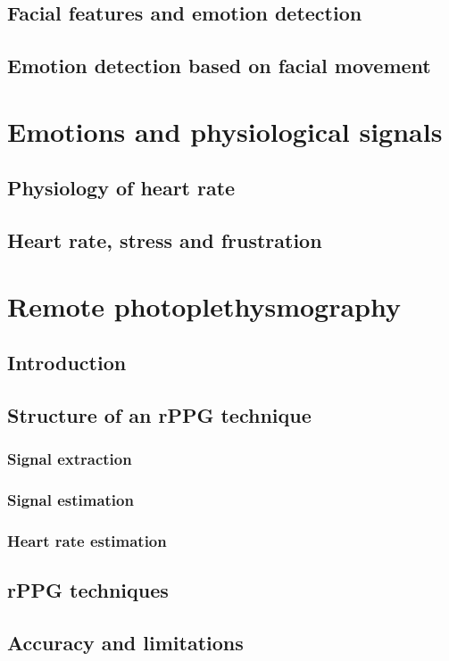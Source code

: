     \subsection{Facial features and emotion detection}
    \subsection{Emotion detection based on facial movement}
  \section{Emotions and physiological signals}
    \subsection{Physiology of heart rate}
    \subsection{Heart rate, stress and frustration}
  \section{Remote photoplethysmography}
    \subsection{Introduction}
    \subsection{Structure of an rPPG technique}
      \subsubsection{Signal extraction}
      \subsubsection{Signal estimation}
      \subsubsection{Heart rate estimation}
    \subsection{rPPG techniques}
    \subsection{Accuracy and limitations}
